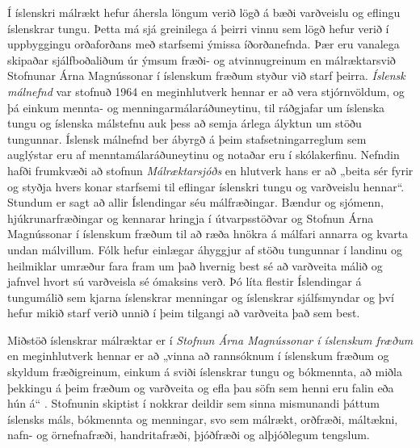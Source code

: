 \documentclass{../../metanetpaper}
\begin{document}
\begin{multicols}{2}
Í íslenskri málrækt hefur áhersla löngum verið lögð á bæði varðveislu og eflingu íslenskrar tungu. Þetta má sjá greinilega á þeirri vinnu sem lögð hefur verið í uppbyggingu orðaforðans með starfsemi ýmissa íðorðanefnda. Þær eru vanalega skipaðar sjálfboðaliðum úr ýmsum fræði- og atvinnugreinum en málræktarsvið Stofnunar Árna Magnússonar í íslenskum fræðum styður við starf þeirra. \textit{Íslensk málnefnd} var stofnuð 1964 \cite{arn1} en meginhlutverk hennar er að vera stjórnvöldum, og þá einkum mennta- og menningarmálaráðuneytinu, til ráðgjafar um íslenska tungu og íslenska málstefnu auk þess að semja árlega ályktun um stöðu tungunnar. Íslensk málnefnd ber ábyrgð á þeim stafsetningarreglum sem auglýstar eru af menntamálaráðuneytinu og notaðar eru í skólakerfinu. Nefndin hafði frumkvæði að stofnun \textit{Málræktarsjóðs} en hlutverk hans er að „beita sér fyrir og styðja hvers konar starfsemi til eflingar íslenskri tungu og varðveislu hennar“\cite{arn2}.  Stundum er sagt að allir Íslendingar séu málfræðingar. Bændur og sjómenn, hjúkrunarfræðingar og kennarar hringja í útvarpsstöðvar og Stofnun Árna Magnússonar í íslenskum fræðum til að ræða hnökra á málfari annarra og kvarta undan málvillum. Fólk hefur einlægar áhyggjur af stöðu tungunnar í landinu og heilmiklar umræður fara fram um það hvernig best sé að varðveita málið og jafnvel hvort sú varðveisla sé ómaksins verð. Þó líta flestir Íslendingar á tungumálið sem kjarna íslenskrar menningar og íslenskrar sjálfsmyndar og því hefur mikið starf verið unnið í þeim tilgangi að varðveita það sem best.

Miðstöð íslenskrar málræktar er í \textit{Stofnun Árna Magnússonar í íslenskum fræðum} en meginhlutverk hennar er að „vinna að rannsóknum í íslenskum fræðum og skyldum fræðigreinum, einkum á sviði íslenskrar tungu og bókmennta, að miðla þekkingu á þeim fræðum og varðveita og efla þau söfn sem henni eru falin eða hún á“ \cite{alt2}. Stofnunin skiptist í nokkrar deildir sem sinna mismunandi þáttum íslensks máls, bókmennta og menningar, svo sem málrækt, orðfræði, máltækni, nafn- og örnefnafræði, handritafræði, þjóðfræði og alþjóðlegum tengslum.
    

\end{multicols}
\end{document}
